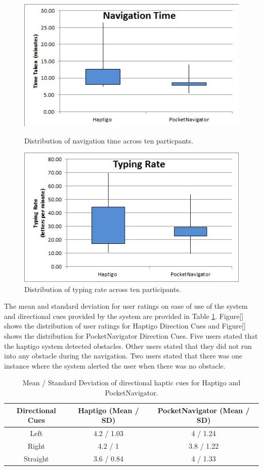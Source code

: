 \documentclass{sigchi}
\newcommand\tabhead[1]{\small\textbf{#1}}
\begin{document}
\begin{figure}[ht]
\centering
\includegraphics[width=0.8\columnwidth]{Images/NavigationTime.jpg}
\label{figure:haptigo:navigationtime}
\caption{Distribution of navigation time across ten particpants.}
\end{figure}
    
\begin{figure}[ht]
\centering
\includegraphics[width=0.8\columnwidth]{Images/TypingRate.jpg}
\caption{Distribution of typing rate across ten participants.}
\label{figure:haptigo:typingrate}
\end{figure}

The mean and standard deviation for user ratings on ease of use of the system and directional cues provided by the system are provided in Table \ref{table:haptigo:directioncues}. Figure[] shows the distribution of user ratings for Haptigo Direction Cues and Figure[] shows the distribution for PocketNavigator\cite{2010_Pielot_MobileHCI} Direction Cues. Five users stated that the haptigo system detected obstacles. Other users stated that they did not run into any obstacle during the navigation. Two users stated that there was one instance where the system alerted the user when there was no obstacle.

\begin{table}[ht]
  \small
  \centering
  \begin{tabular}{|c|c|c|}
    \hline
    \tabhead{Directional Cues} & Haptigo (Mean / SD) & PocketNavigator (Mean / SD) \\
    \hline
    Left & 4.2 / 1.03 & 4 / 1.24\\
    \hline
    Right & 4.2 / 1 & 3.8 / 1.22\\
    \hline
    Straight & 3.6 / 0.84 & 4 / 1.33\\
    \hline
  \end{tabular}
  \caption{Mean / Standard Deviation of directional haptic cues for Haptigo and PocketNavigator.}
  \label{table:haptigo:directioncues}
\end{table}
\end{document}
